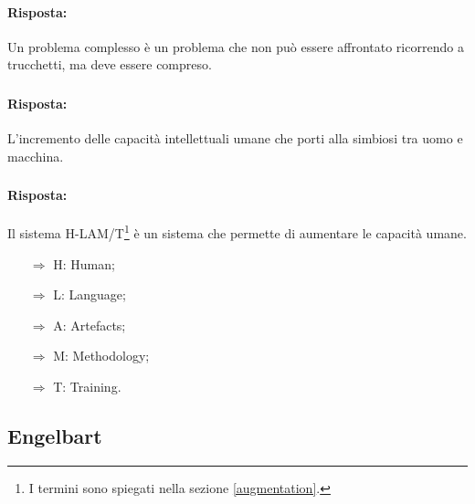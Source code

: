 
\paragraph{Risposta:} Un problema complesso è un problema che non può essere affrontato ricorrendo a trucchetti, ma deve essere compreso.

\subsubsection{}


\paragraph{Risposta:} L'incremento delle capacità intellettuali umane che porti alla simbiosi
tra uomo e macchina.

\subsubsection{}


\paragraph{Risposta:} Il sistema H-LAM/T\footnote{I termini sono spiegati nella sezione \ref{augmentation}.} è un sistema che permette di aumentare le capacità umane.

\begin{itemize}
    \item [$\Rightarrow$] H: Human;
    \item [$\Rightarrow$] L: Language;
    \item [$\Rightarrow$] A: Artefacts;
    \item [$\Rightarrow$] M: Methodology;
    \item [$\Rightarrow$] T: Training.
\end{itemize}








\subsection{Engelbart}

